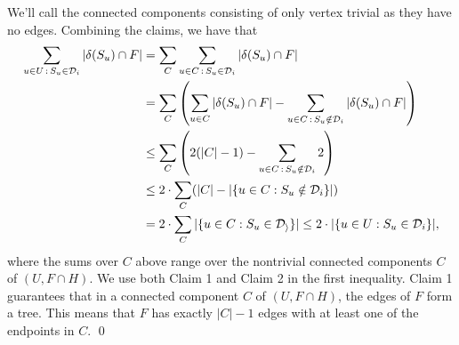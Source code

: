 \begin{pf}
    We'll call the connected components consisting of only vertex trivial 
    as they have no edges. Combining the claims, we have that 
    \begin{align*}
        \sum_{u\in U\,:\,S_u\in {\cal D}_i} |\delta(S_u) \cap F| 
        &= \sum_C \sum_{u\in C\,:\,S_u \in {\cal D}_i} |\delta(S_u) \cap F| \\ 
        &= \sum_C \left( \sum_{u\in C} |\delta(S_u) \cap F| - \sum_{u\in C\,:\,S_u \notin {\cal D}_i} |\delta(S_u) \cap F| \right) \\ 
        &\leq \sum_C \left( 2(|C| - 1) - \sum_{u\in C\,:\,S_u \notin {\cal D}_i} 2 \right) \\ 
        &\leq 2 \cdot \sum_C (|C| - |\{u \in C : S_u \notin {\cal D}_i\}|) \\ 
        &= 2 \cdot \sum_C |\{u \in C: S_u \in {\cal D_i}\}| \leq 2 \cdot |\{u \in U : S_u \in {\cal D}_i\}|, 
    \end{align*}
    where the sums over $C$ above range over the nontrivial connected components $C$ of 
    $(U, F \cap H)$. We use both Claim 1 and Claim 2 in the first inequality. 
    Claim 1 guarantees that in a connected component $C$ of $(U, F \cap H)$, 
    the edges of $F$ form a tree. This means that $F$ has exactly 
    $|C| - 1$ edges with at least one of the endpoints in $C$. \qed 
\end{pf}